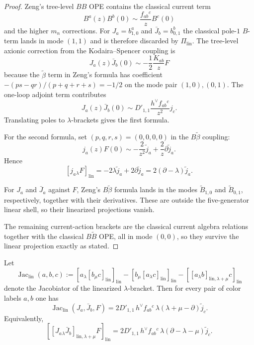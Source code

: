 \begin{proof}
Zeng's tree-level $BB$ OPE contains the classical current term
\[
B^a(z)B^b(0)\sim \frac{f_{ab}{}^c}{z}B^c(0)
\]
and the higher $m_n$ corrections.
For $J_a=b^a_{1,0}$ and $\bar J_b=b^b_{0,1}$ the classical pole-$1$
$B$-term lands in mode $(1,1)$ and is therefore discarded by
$\Pi_{\mathrm{lin}}$.
The tree-level axionic correction from the Kodaira--Spencer coupling is
\[
J_a(z)\bar J_b(0)
\sim
-\frac12\frac{K_{ab}}{z}F
\]
because the $\widetilde\beta$ term in Zeng's formula has coefficient
$-(ps-qr)/(p+q+r+s)=-1/2$ on the mode pair $(1,0),(0,1)$.
The one-loop adjoint term contributes
\[
J_a(z)\bar J_b(0)
\sim
D'_{1,1}\frac{h^\vee f_{ab}{}^c}{z^2}j_c.
\]
Translating poles to $\lambda$-brackets gives the first formula.

For the second formula, set $(p,q,r,s)=(0,0,0,0)$ in the
$B\widetilde\beta$ coupling:
\[
j_a(z)F(0)
\sim
-\frac{2}{z^2}\widetilde j_a
+\frac{2}{z}\partial\widetilde j_a.
\]
Hence
\[
[j_a{}_{\lambda}F]_{\mathrm{lin}}
=
-2\lambda\widetilde j_a + 2\partial\widetilde j_a
=
2(\partial-\lambda)\widetilde j_a.
\]

For $J_a$ and $\bar J_a$ against $F$, Zeng's $B\widetilde\beta$ formula
lands in the modes $\widetilde B_{1,0}$ and $\widetilde B_{0,1}$,
respectively, together with their derivatives.
These are outside the five-generator linear shell, so their linearized
projections vanish.

The remaining current-action brackets are the classical current algebra
relations together with the classical $B\widetilde B$ OPE, all in mode
$(0,0)$, so they survive the linear projection exactly as stated.
\end{proof}

\begin{theorem}
\label{thm:frontier-five-generator-jacobi}
Let
\[
\operatorname{Jac}_{\mathrm{lin}}(a,b,c)
:=[a_{\lambda}[b_{\mu}c]_{\mathrm{lin}}]_{\mathrm{lin}}
-[b_{\mu}[a_{\lambda}c]_{\mathrm{lin}}]_{\mathrm{lin}}
-[[a_{\lambda}b]_{\mathrm{lin},\lambda+\mu}c]_{\mathrm{lin}}
\]
denote the Jacobiator of the linearized $\lambda$-bracket.
Then for every pair of color labels $a,b$ one has
\[
\operatorname{Jac}_{\mathrm{lin}}(J_a,\bar J_b,F)
=
2D'_{1,1}\,h^\vee f_{ab}{}^c\,
\lambda(\lambda+\mu-\partial)\widetilde j_c.
\]
Equivalently,
\[
[[J_a{}_{\lambda}\bar J_b]_{\mathrm{lin},\lambda+\mu}F]_{\mathrm{lin}}
=
2D'_{1,1}\,h^\vee f_{ab}{}^c\,
\lambda(\partial-\lambda-\mu)\widetilde j_c.
\]
\end{theorem}

